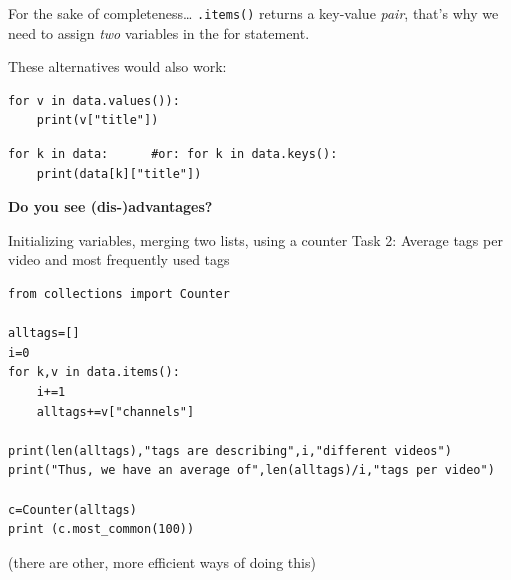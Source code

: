 \documentclass{beamer}
\begin{document}
\begin{frame}[fragile]{For the sake of completeness\ldots}
\texttt{.items()} returns a key-value \emph{pair}, that's why we need to assign \emph{two} variables in the for statement.

These alternatives would also work:
\begin{lstlisting}
for v in data.values()):
	print(v["title"])
\end{lstlisting}

\begin{lstlisting}
for k in data:      #or: for k in data.keys():
	print(data[k]["title"])
\end{lstlisting}

\textbf{Do you see (dis-)advantages?}
\end{frame}



\begin{frame}[plain]{}
\end{frame}



\begin{frame}[fragile]{Initializing variables, merging two lists, using a counter}
Task 2: Average tags per video and most frequently used tags
\begin{lstlisting}
from collections import Counter
    
alltags=[]
i=0
for k,v in data.items():
    i+=1
    alltags+=v["channels"]

print(len(alltags),"tags are describing",i,"different videos")
print("Thus, we have an average of",len(alltags)/i,"tags per video")

c=Counter(alltags)
print (c.most_common(100))
\end{lstlisting}
\scriptsize{(there are other, more efficient ways of doing this)}

\end{frame}
\end{document}
